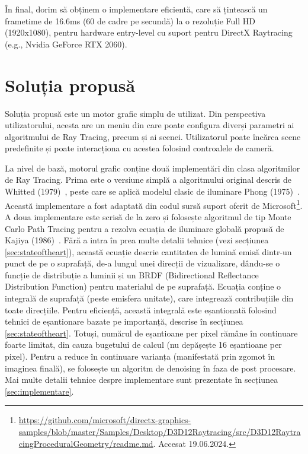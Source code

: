 \documentclass[12pt,a4paper]{report}
\numberwithin{equation}{section} %
\begin{document}
În final, dorim să obținem o implementare eficientă, care să țintească un frametime de 16.6ms
(60 de cadre pe secundă) la o rezoluție Full HD (1920x1080), pentru hardware entry-level cu suport pentru
DirectX Raytracing (e.g., Nvidia GeForce RTX 2060).

\subsubsection*{}

\section{Soluția propusă}
Soluția propusă este un motor grafic simplu de utilizat. Din perspectiva utilizatorului,
acesta are un meniu din care poate configura diverși parametri ai algoritmului
de Ray Tracing, precum și ai scenei. Utilizatorul poate încărca scene predefinite
și poate interacționa cu acestea folosind controalele de cameră.

La nivel de bază, motorul grafic conține două implementări din clasa algoritmilor
de Ray Tracing. Prima este o versiune simplă a algoritmului original descris de
Whitted (1979)~\cite{Whitted}, peste care se aplică modelul clasic de iluminare
Phong (1975)~\cite{Phong}. Această implementare a fost adaptată din codul sursă
suport oferit de Microsoft\footnote{\url{https://github.com/microsoft/directx-graphics-samples/blob/master/Samples/Desktop/D3D12Raytracing/src/D3D12RaytracingProceduralGeometry/readme.md}. Accesat 19.06.2024.}.
A doua implementare este scrisă de la zero și folosește algoritmul de tip Monte Carlo
Path Tracing pentru a rezolva ecuația de iluminare globală propusă de Kajiya (1986)~\cite{Kajiya}.
Fără a intra în prea multe detalii tehnice (vezi secțiunea \ref{sec:stateoftheart}),
această ecuație descrie cantitatea de lumină emisă dintr-un punct de pe o suprafață,
de-a lungul unei direcții de vizualizare, dându-se o funcție de distribuție a luminii
și un BRDF (Bidirectional Reflectance Distribution Function) pentru materialul de pe
suprafață. Ecuația conține o integrală de suprafață (peste emisfera unitate), care
integrează contribuțiile din toate direcțiile. Pentru eficiență, această integrală
este eșantionată folosind tehnici de eșantionare bazate pe importanță, descrise în secțiunea \ref{sec:stateoftheart}.
Totuși, numărul de eșantioane per pixel rămâne în continuare foarte limitat, din
cauza bugetului de calcul (nu depășește 16 eșantioane per pixel). Pentru a reduce
în continuare varianța (manifestată prin zgomot în imaginea finală), se folosește
un algoritm de denoising în faza de post procesare. Mai multe detalii tehnice
despre implementare sunt prezentate în secțiunea \ref{sec:implementare}.
\end{document}
